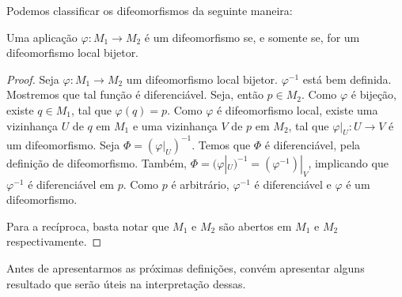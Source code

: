 Podemos classificar os difeomorfismos da seguinte maneira:
\begin{proposition}
    \label{loc:2.9_:_def_4_:_difeomorfismo.resultados_acerca_difeomorfismos..proposição_1}
    Uma aplicação $\varphi:M_{1}\to M_{2}$ é um difeomorfismo se, e somente se, for um difeomorfismo local bijetor.
    \begin{proof}

        Seja $\varphi:M_{1}\to M_{2}$ um difeomorfismo local bijetor. $\varphi ^{-1}$ está bem definida. Mostremos que tal função é diferenciável. Seja, então $p \in M_{2}$. Como $\varphi$ é bijeção, existe $q \in M_{1}$, tal que $\varphi(q)=p$. Como $\varphi$ é difeomorfismo local, existe uma vizinhança $U$ de $q$ em $M_{1}$ e uma vizinhança $V$ de $p$ em $M_{2}$, tal que $\varphi|_{U}:U\to V$ é um difeomorfismo. Seja $\Phi = (\varphi|_{U})^{-1}$. Temos que $\Phi$ é diferenciável, pela definição de difeomorfismo. Também, $\Phi=(\varphi|_{U})^{-1}=(\varphi ^{-1})|_{V}$, implicando que $\varphi ^{-1}$ é diferenciável em $p$. Como $p$ é arbitrário, $\varphi ^{-1}$ é diferenciável e $\varphi$ é um difeomorfismo.

        Para a recíproca, basta notar que $M_{1}$ e $M_{2}$ são abertos em $M_{1}$ e $M_{2}$ respectivamente.
    \end{proof}
\end{proposition}
Antes de apresentarmos as próximas definições, convém apresentar alguns resultado que serão úteis na interpretação dessas.
